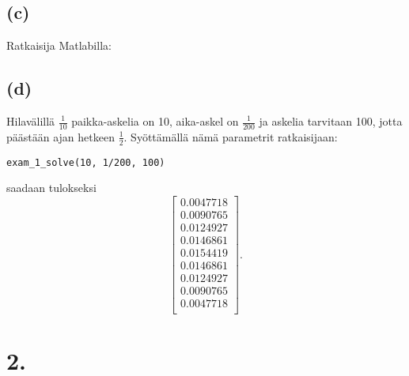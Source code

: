 \documentclass{article}
\begin{document}
\subsection*{(c)}

Ratkaisija Matlabilla:



\subsection*{(d)}

Hilavälillä $\frac{1}{10}$ paikka-askelia on 10, aika-askel on $\frac{1}{200}$
ja askelia tarvitaan 100, jotta päästään ajan hetkeen $\frac{1}{2}$.
Syöttämällä nämä parametrit ratkaisijaan:

\begin{verbatim}
exam_1_solve(10, 1/200, 100)
\end{verbatim}

saadaan tulokseksi
\[
  \begin{bmatrix}
   0.0047718 \\
   0.0090765 \\
   0.0124927 \\
   0.0146861 \\
   0.0154419 \\
   0.0146861 \\
   0.0124927 \\
   0.0090765 \\
   0.0047718 \\
  \end{bmatrix}.
\]

\newpage
\section*{2.}
\end{document}
